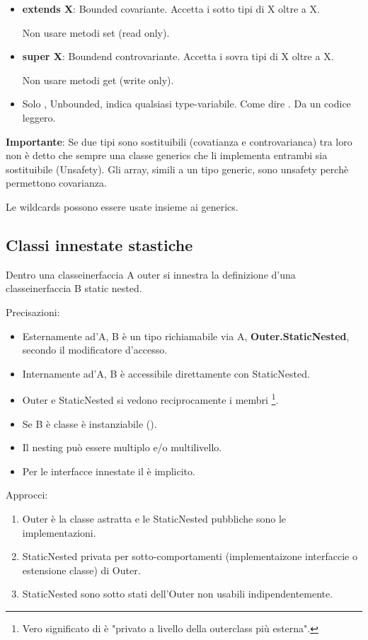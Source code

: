 \begin{itemize}
	\item \textbf{extends X}: Bounded covariante. Accetta i sotto tipi di X oltre a X.

	Non usare metodi set (read only).
	\item \textbf{super X}: Boundend controvariante. Accetta i sovra tipi di X oltre a X.

	Non usare metodi get (write only).
	\item Solo , Unbounded, indica qualsiasi type-variabile. Come dire . Da un codice leggero.
\end{itemize}

\textbf{Importante}: Se due tipi sono sostituibili (covatianza e controvarianca) tra loro non è detto che sempre una classe generics che li implementa entrambi sia sostituibile (Unsafety).
Gli array, simili a un tipo generic, sono unsafety perchè permettono covarianza.

Le wildcards possono essere usate insieme ai generics.

\subsection{Classi innestate stastiche}
Dentro una classe\textbar inerfaccia A outer si innestra la definizione d'una classe\textbar inerfaccia B static nested.


Precisazioni:
\begin{itemize}
	\item Esternamente ad'A, B è un tipo richiamabile via A, \textbf{Outer.StaticNested}, secondo il modificatore d'accesso.
	\item Internamente ad'A, B è accessibile direttamente con StaticNested.
	\item Outer e StaticNested si vedono reciprocamente i membri \footnote{Vero significato di  è "privato a livello della outerclass più esterna".}.
	\item Se B è classe è instanziabile ().
	\item Il nesting può essere multiplo e/o multilivello.
	\item Per le interfacce innestate il  è implicito.
\end{itemize}

Approcci:
\begin{enumerate}
	\item Outer è la classe astratta e le StaticNested pubbliche sono le implementazioni.
	\item StaticNested privata per sotto-comportamenti (implementaizone interfaccie o estensione classe) di Outer.
	\item StaticNested sono sotto stati dell'Outer non usabili indipendentemente.
\end{enumerate}

